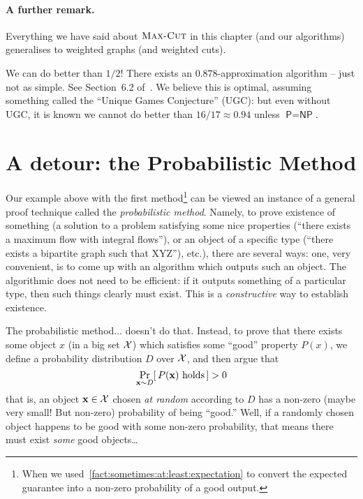 \paragraph{A further remark.} Everything we have said about $\textsc{Max-Cut}$ in this chapter (and our algorithms) generalises to weighted graphs (and weighted cuts). 

\begin{fact}
    We can do better than $1/2$! There exists an $0.878$-approximation algorithm -- just not as simple. See Section~6.2 of~\cite{WilliamsonS}. We believe this is optimal, assuming something called the ``Unique Games Conjecture'' (UGC): but even without UGC, it is known we cannot do better than $16/17\approx 0.94$ unless $\textsf{P}=\textsf{NP}$.
\end{fact}

\section{A detour: the Probabilistic Method}
Our example above with the first method\footnote{When we used~\cref{fact:sometimes:at:least:expectation} to convert the expected guarantee into a non-zero probability of a good output.} can be viewed an instance of a general proof technique called the \emph{probabilistic method}. Namely, to prove existence of something (\eg a solution to a problem satisfying some nice properties (``there exists a maximum flow with integral flows''), or an object of a specific type (``there exists a bipartite graph such that XYZ''), etc.), there are several ways: one, very convenient, is to come up with an algorithm which outputs such an object. The algorithmic does not need to be efficient: if it outputs something of a particular type, then such things clearly must exist. This is a \emph{constructive} way to establish existence.

The probabilistic method... doesn't do that. Instead, to prove that there exists some object $x$ (in a big set $\mathcal{X}$) which satisfies some ``good'' property $P(x)$, we define a probability distribution $D$ over $\mathcal{X}$, and then argue that 
\begin{equation}
    \probaDistrOf{\mathbf{x}\sim D}{P(\mathbf{x}) \text{ holds}} > 0
\end{equation}
that is, an object $\mathbf{x} \in \mathcal{X}$ chosen \emph{at random} according to $D$ has a non-zero (maybe very small! But non-zero) probability of being ``good.'' Well, if a randomly chosen object happens to be good with some non-zero probability, that means there must exist \emph{some} good objects\dots

